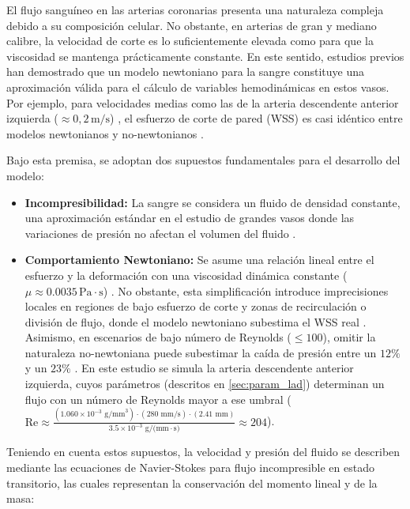 \documentclass[12pt, letterpaper]{article}
\begin{document}
El flujo sanguíneo en las arterias coronarias presenta una naturaleza compleja debido a su composición celular. No obstante, en arterias de gran y mediano calibre, la velocidad de corte es lo suficientemente elevada como para que la viscosidad se mantenga prácticamente constante. En este sentido, estudios previos \cite{modelnonnewtonian,johnston_non-newtonian_2004,cho_nonnewtonian_1991} han demostrado que un modelo newtoniano para la sangre constituye una aproximación válida para el cálculo de variables hemodinámicas en estos vasos. Por ejemplo, para velocidades medias como las de la arteria descendente anterior izquierda ($\approx 0,2\,\text{m/s}$) \cite{velocity_lad}, el esfuerzo de corte de pared (WSS) es casi idéntico entre modelos newtonianos y no-newtonianos \cite{johnston_non-newtonian_2004}.

Bajo esta premisa, se adoptan dos supuestos fundamentales para el desarrollo del modelo:
\begin{itemize}
  \item \textbf{Incompresibilidad:} La sangre se considera un fluido de densidad constante, una aproximación estándar en el estudio de grandes vasos donde las variaciones de presión no afectan el volumen del fluido \cite{ku_blood_1997}.
  \item \textbf{Comportamiento Newtoniano:} Se asume una relación lineal entre el esfuerzo y la deformación con una viscosidad dinámica constante ($\mu \approx 0.0035 \, \text{Pa} \cdot \text{s}$) \cite{ku_blood_1997}. No obstante, esta simplificación introduce imprecisiones locales en regiones de bajo esfuerzo de corte y zonas de recirculación o división de flujo, donde el modelo newtoniano subestima el WSS real \cite{cho_nonnewtonian_1991,johnston_non-newtonian_2004}. Asimismo, en escenarios de bajo número de Reynolds ($\le 100$), omitir la naturaleza no-newtoniana puede subestimar la caída de presión entre un $12\%$ y un $23\%$ \cite{cho_nonnewtonian_1991}. En este estudio se simula la arteria descendente anterior izquierda, cuyos parámetros (descritos en \cref{sec:param_lad}) determinan un flujo con un número de Reynolds mayor a ese umbral ($\text{Re} \approx \frac{(1.060 \times 10^{-3} \text{ g/mm}^3) \cdot (280 \text{ mm/s}) \cdot (2.41 \text{ mm})}{3.5 \times 10^{-3} \text{ g/(mm}\cdot\text{s)}} \approx 204$).
\end{itemize}

Teniendo en cuenta estos supuestos, la velocidad y presión del fluido se describen mediante las ecuaciones de Navier-Stokes para flujo incompresible en estado transitorio, las cuales representan la conservación del momento lineal y de la masa:
\end{document}
